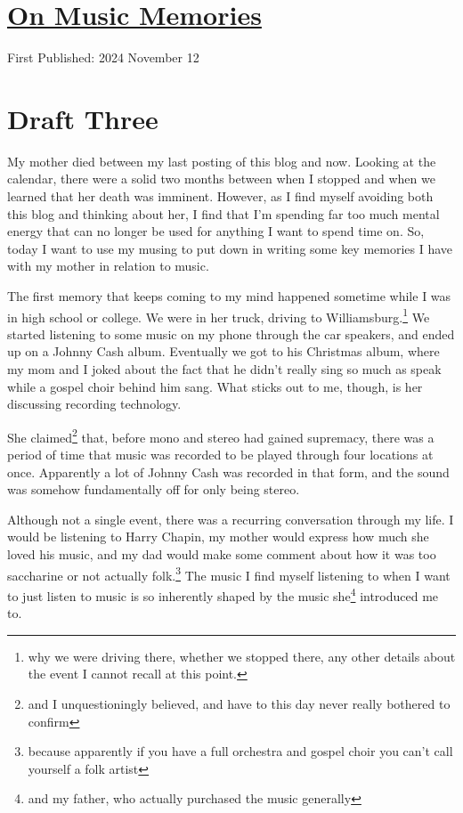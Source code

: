 \documentclass[12pt]{article}[titlepage]
\newcommand{\1}{\={a}}
\newcommand{\2}{\={e}}
\newcommand{\3}{\={\i}}
\newcommand{\4}{\=o}
\newcommand{\5}{\=u}
\newcommand{\6}{\={A}}
\renewcommand{\,}{\textsuperscript{,}}
\begin{document}
\doublespacing
\section{\href{music-memories.tex}{On Music Memories}}
First Published: 2024 November 12
\section{Draft Three}My mother died between my last posting of this blog and now.  
Looking at the calendar, there were a solid two months between when I stopped and when we learned that her death was imminent.  
However, as I find myself avoiding both this blog and thinking about her, I find that I'm spending far too much mental energy that can no longer be used for anything I want to spend time on.  
So, today I want to use my musing to put down in writing some key memories I have with my mother in relation to music.

The first memory that keeps coming to my mind happened sometime while I was in high school or college.  
We were in her truck, driving to Williamsburg.\footnote{why we were driving there, whether we stopped there, any other details about the event I cannot recall at this point.}  
We started listening to some music on my phone through the car speakers, and ended up on a Johnny Cash album.  
Eventually we got to his Christmas album, where my mom and I joked about the fact that he didn't really sing so much as speak while a gospel choir behind him sang.  
What sticks out to me, though, is her discussing recording technology.

She claimed\footnote{and I unquestioningly believed, and have to this day never really bothered to confirm} that, before mono and stereo had gained supremacy, there was a period of time that music was recorded to be played through four locations at once.  
Apparently a lot of Johnny Cash was recorded in that form, and the sound was somehow fundamentally off for only being stereo.

Although not a single event, there was a recurring conversation through my life.  
I would be listening to Harry Chapin, my mother would express how much she loved his music, and my dad would make some comment about how it was too saccharine or not actually folk.\footnote{because apparently if you have a full orchestra and gospel choir you can't call yourself a folk artist}  
The music I find myself listening to when I want to just listen to music is so inherently shaped by the music she\footnote{and my father, who actually purchased the music generally} introduced me to.
\end{document}
